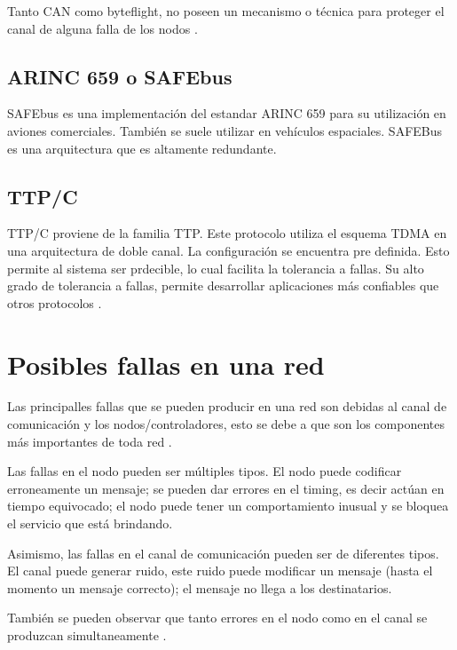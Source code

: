 Tanto CAN como byteflight, no poseen un mecanismo o técnica para proteger el canal de alguna falla de los nodos \citep{Lisner07}. 

\subsection{ARINC 659 o SAFEbus}
SAFEbus es una implementación del estandar ARINC 659 para su utilización en aviones comerciales. También se suele utilizar en vehículos espaciales. SAFEBus es una arquitectura que es altamente redundante.

\subsection{TTP/C}
TTP/C proviene de la familia TTP. Este protocolo utiliza el esquema TDMA en una arquitectura de doble canal. La configuración se encuentra pre definida. Esto permite al sistema ser prdecible, lo cual facilita la tolerancia a fallas. Su alto grado de tolerancia a fallas, permite desarrollar aplicaciones más confiables que otros protocolos \citep{Lisner07}.

\section{Posibles fallas en una red}
Las principalles fallas que se pueden producir en una red son debidas al canal de comunicación y los nodos/controladores, esto se debe a que son los componentes más importantes de toda red \citep{Lisner07}.

Las fallas en el nodo pueden ser múltiples tipos. El nodo puede codificar erroneamente un mensaje; se pueden dar errores en el timing, es decir actúan en tiempo equivocado; el nodo puede tener un comportamiento inusual y se bloquea el servicio que está brindando.

Asimismo, las fallas en el canal de comunicación pueden ser de diferentes tipos. El canal puede generar ruido, este ruido puede modificar un mensaje (hasta el momento un mensaje correcto); el mensaje no llega a los destinatarios.

También se pueden observar que tanto errores en el nodo como en el canal se produzcan simultaneamente \citep{Lisner07}.
